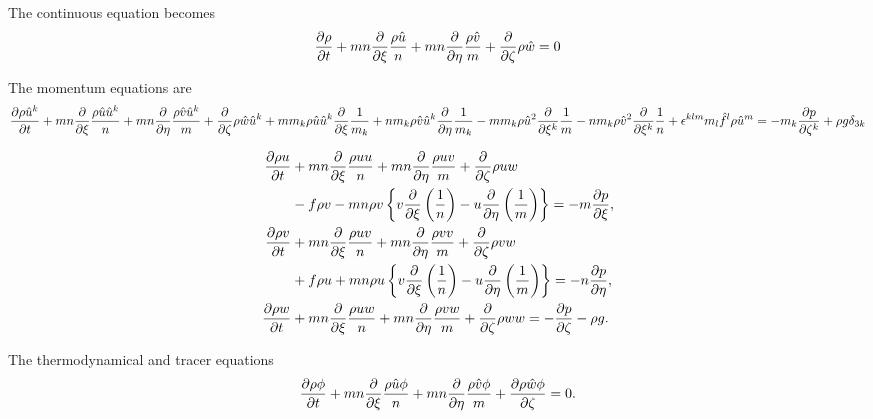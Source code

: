 \documentclass{book}
\begin{document}
The continuous equation becomes
\begin{equation}
  \pd{\rho}{t} + mn\pd{}{\xi}\frac{\rho \hat{u}}{n} + mn\pd{}{\eta}\frac{\rho \hat{v}}{m} + \pd{}{\zeta}\rho \hat{w} = 0
\end{equation}

The momentum equations are
\begin{equation}
  \pd{\rho\hat{u}^k}{t}
  + mn\pd{}{\xi}\frac{\rho \hat{u} \hat{u}^k}{n}
  + mn\pd{}{\eta}\frac{\rho \hat{v} \hat{u}^k}{m}
  + \pd{}{\zeta}\rho \hat{w} \hat{u}^k
  + m m_k \rho \hat{u} \hat{u}^k \pd{}{\xi}\frac{1}{m_k}
  + n m_k \rho \hat{v} \hat{u}^k \pd{}{\eta}\frac{1}{m_k}
  - m m_k \rho \hat{u}^2 \pd{}{\xi^k}\frac{1}{m}
  - n m_k \rho \hat{v}^2 \pd{}{\xi^k}\frac{1}{n}
  + \epsilon^{klm} m_l \hat{f}^l \rho \hat{u}^m
  = -m_k \pd{p}{\zeta^k} + \rho g \delta_{3k}
\end{equation}

\begin{align}
  \pd{\rho u}{t} &+ mn\pd{}{\xi}\frac{\rho uu}{n} + mn\pd{}{\eta}\frac{\rho uv}{m} + \pd{}{\zeta}\rho uw \\
  &- f\rho v - mn \rho v\left\{v\pd{}{\xi}\left(\frac{1}{n}\right) - u\pd{}{\eta}\left(\frac{1}{m}\right)\right\} = -m\pd{p}{\xi}, \\
  \pd{\rho v}{t} &+ mn\pd{}{\xi}\frac{\rho uv}{n} + mn\pd{}{\eta}\frac{\rho vv}{m} + \pd{}{\zeta}\rho vw \\
  &+f\rho u + mn \rho u\left\{v\pd{}{\xi}\left(\frac{1}{n}\right) - u\pd{}{\eta}\left(\frac{1}{m}\right)\right\} = -n\pd{p}{\eta}, \\
  \pd{\rho w}{t} &+ mn\pd{}{\xi}\frac{\rho uw}{n} + mn\pd{}{\eta}\frac{\rho vw}{m} + \pd{}{\zeta}\rho ww = -\pd{p}{\zeta} -\rho g.
\end{align}

The thermodynamical and tracer equations
\begin{equation}
  \pd{\rho \phi}{t} + mn\pd{}{\xi}\frac{\rho \hat{u}\phi}{n} + mn\pd{}{\eta}\frac{\rho \hat{v}\phi}{m} + \pd{\rho \hat{w}\phi}{\zeta} = 0.
\end{equation}
\end{document}
